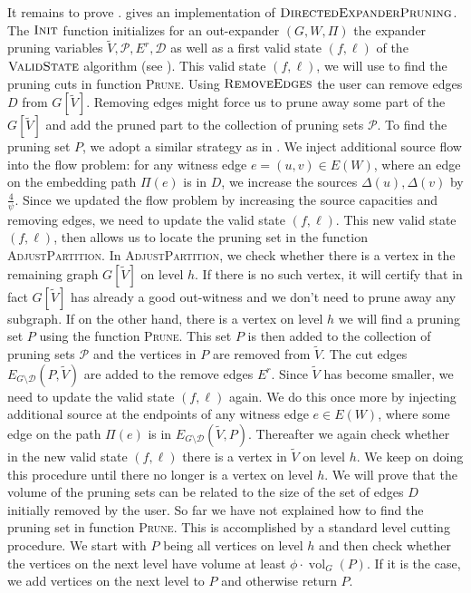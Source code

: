 \documentclass[11pt]{article}
\newcommand\bell{\boldsymbol{\mathit{\ell}}}
\newcommand\ff{\boldsymbol{\mathit{f}}}
\DeclareMathOperator{\vol}{vol}
\begin{document}
It remains to prove .     gives an implementation of $\textsc{DirectedExpanderPruning}$. The $\textsc{Init}$ function initializes for an out-expander $(G, W, \Pi)$ the expander pruning variables $\tilde{V}, \mathcal{P}, E^r, \mathcal{D}$ as well as a first valid state $(\ff, \bell)$ of the $\textsc{ValidState}$ algorithm (see ). This valid state $(\ff, \bell)$, we will use to find the pruning cuts in function \textsc{Prune}. Using $\textsc{RemoveEdges}$ the user can remove edges $D$ from $G[\tilde{V}]$. Removing edges might force us to prune away some part of the $G[\tilde{V}]$ and add the pruned part to the collection of pruning sets $\mathcal{P}$. To find the pruning set $P$, we adopt a similar strategy as in \cite{saranurak2019expander}. We inject additional source flow into the flow problem: for any witness edge $e = (u,v) \in E(W)$, where an edge on the embedding path $\Pi(e)$ is in $D$, we increase the sources $\Delta(u), \Delta(v)$ by $\frac{4}{\psi}$. Since we updated the flow problem by increasing the source capacities and removing edges, we need to update the valid state $(\ff, \bell)$. This new valid state $(\ff, \bell)$, then allows us to locate the pruning set in the function \textsc{AdjustPartition}. In \textsc{AdjustPartition}, we check whether there is a vertex in the remaining graph $G[\tilde{V}]$ on level $h$. If there is no such vertex, it will certify that in fact $G[\tilde{V}]$ has already a good out-witness and we don't need to prune away any subgraph. If on the other hand, there is a vertex on level $h$ we will find a pruning set $P$ using the function \textsc{Prune}. This set $P$ is then added to the collection of pruning sets $\mathcal{P}$ and the vertices in $P$ are removed from $\tilde{V}$. The cut edges $E_{G\setminus \mathcal{D}}(P,\tilde{V})$ are added to the remove edges $E^r$. Since $\tilde{V}$ has become smaller, we need to update the valid state $(\ff, \bell)$ again. We do this once more by injecting additional source at the endpoints of any witness edge $e \in E(W)$, where some edge on the path $\Pi(e)$ is in $E_{G\setminus \mathcal{D}}(\tilde{V},P)$. Thereafter we again check whether in the new valid state $(\ff, \bell)$ there is a vertex in $\tilde{V}$ on level $h$. We keep on doing this procedure until there no longer is a vertex on level $h$. We will prove that the volume of the pruning sets can be related to the size of the set of edges $D$ initially removed by the user. So far we have not explained how to find the pruning set in function \textsc{Prune}. This is accomplished by a standard level cutting procedure. We start with $P$ being all vertices on level $h$ and then check whether the vertices on the next level have volume at least $\phi \cdot \vol_G(P)$. If it is the case, we add vertices on the next level to $P$ and otherwise return $P$.
\end{document}
